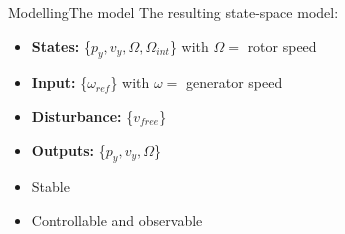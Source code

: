 
\begin{frame}{Modelling}{The model}
	The resulting state-space model:
	\begin{itemize}
		\item \textbf{States:} \{$ p_y, v_y, \Omega, \Omega_{int} $\} \hspace{1mm} with $ \Omega =$ rotor speed
		\item \textbf{Input:} \{$ \omega_{ref} $\} \hspace{1mm} with $ \omega =$ generator speed
		\item \textbf{Disturbance:} \{$ v_{free} $\}
		\item \textbf{Outputs:} \{$ p_y, v_y, \Omega $\}
		\item Stable
		\item Controllable and observable
	\end{itemize}	
\end{frame}
